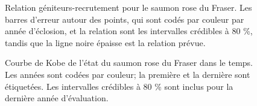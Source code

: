 \documentclass[french,11pt]{book}
\begin{document}
\begin{figure}[htb]

{\centering {} 

}

\caption{Relation géniteurs-recrutement pour le saumon rose du Fraser. Les barres d'erreur autour des points, qui sont codés par couleur par année d'éclosion, et la relation sont les intervalles crédibles à 80 \%, tandis que la ligne noire épaisse est la relation prévue.}\label{fig:fig-SRR}
\end{figure}

\begin{figure}[htb]

{\centering {} 

}

\caption{Courbe de Kobe de l'état du saumon rose du Fraser dans le temps. Les années sont codées par couleur; la première et la dernière sont étiquetées. Les intervalles crédibles à 80 \% sont inclus pour la dernière année d'évaluation.}\label{fig:fig-kobe}
\end{figure}
\end{document}
